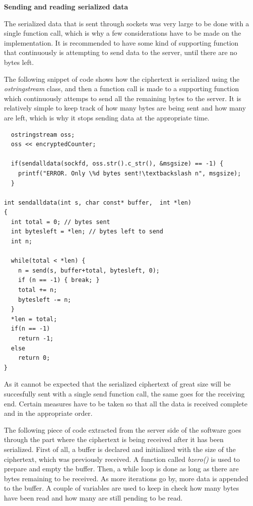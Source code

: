 \textbf{Sending and reading serialized data}

The serialized data that is sent through sockets was very large to be done with a single function call, which is why a few considerations have to be made on the implementation. It is recommended to have some kind of supporting function that continuously is attempting to send data to the server, until there are no bytes left.

The following snippet of code shows how the ciphertext is serialized using the \textit{ostringstream} class, and then a function call is made to a supporting function which continuously attemps to send all the remaining bytes to the server. It is relatively simple to keep track of how many bytes are being sent and how many are left, which is why it stops sending data at the appropriate time.

\begin{lstlisting}
  ostringstream oss;
  oss << encryptedCounter;

  if(sendalldata(sockfd, oss.str().c_str(), &msgsize) == -1) {
    printf("ERROR. Only \%d bytes sent!\textbackslash n", msgsize);
  }

int sendalldata(int s, char const* buffer,  int *len)
{
  int total = 0; // bytes sent
  int bytesleft = *len; // bytes left to send
  int n;
  
  while(total < *len) {
    n = send(s, buffer+total, bytesleft, 0);
    if (n == -1) { break; }
    total += n;
    bytesleft -= n;
  }
  *len = total; 
  if(n == -1) 
    return -1;
  else 
    return 0;
}
\end{lstlisting}

As it cannot be expected that the serialized ciphertext of great size will be succesfully sent with a single send function call, the same goes for the receiving end. Certain measures have to be taken so that all the data is received complete and in the appropriate order.

The following piece of code extracted from the server side of the software goes through the part where the ciphertext is being received after it has been serialized. First of all, a buffer is declared and initialized with the size of the ciphertext, which was previously received. A function called \textit{bzero()} is used to prepare and empty the buffer.  Then, a while loop is done as long as there are bytes remaining to be received. As more iterations go by, more data is appended to the buffer. A couple of variables are used to keep in check how many bytes have been read and how many are still pending to be read.

